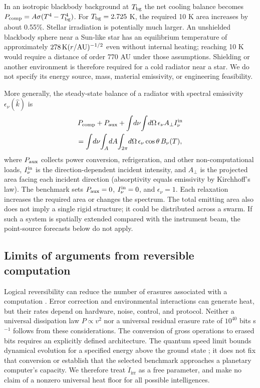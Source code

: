 \documentclass[10pt,twocolumn]{article}
\newcommand{\Iirr}{\dot I_{\mathrm{irr}}}
\begin{document}
In an isotropic blackbody background at $T_{\rm bg}$ the net cooling
balance becomes $P_{\rm comp}=A\sigma(T^4-T_{\rm bg}^4)$.
For $T_{\rm bg}=2.725$ K, the required 10 K area increases by about
0.55\%. Stellar irradiation is potentially much larger. An unshielded
blackbody sphere near a Sun-like star has an equilibrium temperature
of approximately $278\,{\rm K}(r/{\rm AU})^{-1/2}$ even without internal
heating; reaching 10 K would require a distance of order 770 AU under
those assumptions. Shielding or another environment is therefore
required for a cold radiator near a star. We do not specify its energy
source, mass, material emissivity, or engineering feasibility.

More generally, the steady-state balance of a radiator with
spectral emissivity $\epsilon_\nu(\hat k)$ is
\begin{multline}
P_{\rm comp}+P_{\rm aux}
+\int\!d\nu\!\int\!d\Omega\,\epsilon_\nu A_\perp I^{\rm in}_\nu \\
=\int\!d\nu\!\int_A\!dA\!\int_{2\pi}\!d\Omega\,
\epsilon_\nu\cos\theta\,B_\nu(T),
\end{multline}
where $P_{\rm aux}$ collects power conversion, refrigeration, and other
non-computational loads, $I^{\rm in}_\nu$ is the direction-dependent
incident intensity, and $A_\perp$ is the projected area facing each
incident direction (absorptivity equals emissivity by Kirchhoff's law).
The benchmark sets $P_{\rm aux}=0$, $I^{\rm in}_\nu=0$, and
$\epsilon_\nu=1$. Each relaxation increases the required area or changes
the spectrum. The total emitting area also does not imply a single rigid
structure; it could be distributed across a swarm. If such a system is
spatially extended compared with the instrument beam, the point-source
forecasts below do not apply.

\subsection{Limits of arguments from reversible computation}
Logical reversibility can reduce the number of erasures associated with
a computation \cite{Bennett1973}. Error correction and environmental
interactions can generate heat, but their rates depend on hardware,
noise, control, and protocol. Neither a universal dissipation law
$P\propto v^2$ nor a universal residual erasure rate of $10^{40}$ bits
s$^{-1}$ follows from these considerations. The conversion of gross
operations to erased bits requires an explicitly defined architecture.
The quantum speed limit bounds dynamical evolution for a specified
energy above the ground state \cite{Margolus1998}; it does not fix that
conversion or establish that the selected benchmark approaches a
planetary computer's capacity. We therefore treat $\Iirr$ as a free
parameter, and make no claim of a nonzero universal heat floor for all
possible intelligences.
\end{document}
